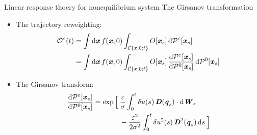 \documentclass[fleqn]{beamer}
\newcommand{\redc}[1]{{\color{red} #1}}
\newcommand{\bluec}[1]{{\color{blue} #1}}
\newcommand{\vect}[1]{\textbf{\textit{#1}}}
\newcommand{\dd}[0]{\textrm{d}}
\newcommand{\fe}{u}
\newcommand{\eps}{\varepsilon}
\newcommand{\mo}{\mathcal O}
\newcommand{\mc}{\mathcal C}
\newcommand{\pathmeas}{\mathcal P}
\begin{document}
\begin{frame}{Linear response thoery for nonequilibrium system}
  {The Girsanov transformation}
  \begin{itemize}
  \item <1-> The trajectory reweighting:
    \bluec{
      \begin{align*}
        \mo^\eps(t)
        &= \int \dd \vect x\, f(\vect x, 0)
        \int_{\mc\{\vect x,0; t\}} O[\vect x_s]\,\dd \pathmeas^\eps[\vect x_s]\\
        &= \int \dd \vect x\, f(\vect x, 0)
        \int_{\mc\{\vect x,0; t\}} O[\vect x_s]\,
        \frac{\dd\pathmeas^\eps[\vect x_s]}{\dd\pathmeas^0[\vect x_s]}\,
        \dd\pathmeas^0[\vect x_s]
      \end{align*}
    }
  \item<2-> The \redc{Girsanov transform}:
    \bluec{
      \begin{align*}
        \frac{\dd\pathmeas^\eps[\vect x_s]}{\dd\pathmeas^0[\vect x_s]}
        =
        \exp
        \Big[\:&
        \frac{\eps}\sigma\int_0^t
        \delta\fe(s)\,\vect D(\vect q_s)\cdot\dd\vect W_s\\
        &-
        \frac {\eps^2}{2\sigma^2}\int_0^t
        \delta\fe^2(s)\,\vect D^2(\vect q_s)\,\dd s\:
        \Big]
      \end{align*}
    }
  \end{itemize}
\end{frame}


\end{document}
